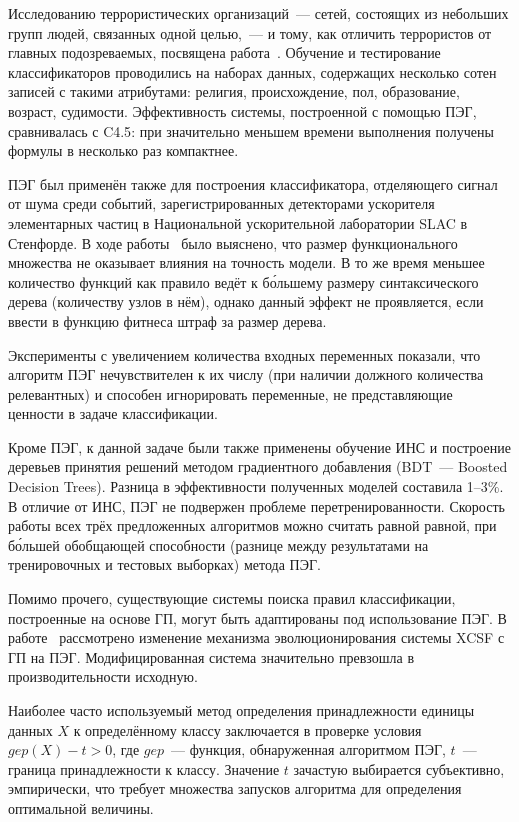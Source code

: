 Исследованию террористических организаций~--- сетей, состоящих из небольших групп людей, связанных одной целью,~--- и тому, как отличить террористов от главных подозреваемых, посвящена работа~\cite{conf/wisi/QiaoTPFX06}. Обучение и тестирование классификаторов проводились на наборах данных, содержащих несколько сотен записей с такими атрибутами: религия, происхождение, пол, образование, возраст, судимости. Эффективность системы, построенной с помощью ПЭГ, сравнивалась с {C4.5}: при значительно меньшем времени выполнения получены формулы в несколько раз компактнее.

ПЭГ был применён также для построения классификатора, отделяющего сигнал от шума среди событий, зарегистрированных детекторами ускорителя элементарных частиц в Национальной ускорительной лаборатории SLAC в Стенфорде. В ходе работы~\cite{Teodorescu:2006:IEEETNS} было выяснено, что размер функционального множества не оказывает влияния на точность модели. В то же время меньшее количество функций как правило ведёт к б\'{о}льшему размеру синтаксического дерева (количеству узлов в нём), однако данный эффект не проявляется, если ввести в функцию фитнеса штраф за размер дерева.

Эксперименты с увеличением количества входных переменных показали, что алгоритм ПЭГ нечувствителен к их числу (при наличии должного количества релевантных) и способен игнорировать переменные, не представляющие ценности в задаче классификации.

Кроме ПЭГ, к данной задаче были также применены обучение ИНС и построение деревьев принятия решений методом градиентного добавления (BDT~--- Boosted Decision Trees). Разница в эффективности полученных моделей составила 1--3\%. В отличие от ИНС, ПЭГ не подвержен проблеме перетренированности. Скорость работы всех трёх предложенных алгоритмов можно считать равной равной, при б\'{о}льшей обобщающей способности (разнице между результатами на тренировочных и тестовых выборках) метода ПЭГ.

Помимо прочего, существующие системы поиска правил классификации, построенные на основе ГП, могут быть адаптированы под использование ПЭГ. В работе~\cite{conf/iwcls/Wilson07} рассмотрено изменение механизма эволюционирования системы XCSF с ГП на ПЭГ. Модифицированная система значительно превзошла в производительности исходную.

Наиболее часто используемый метод определения принадлежности единицы данных $X$ к определённому классу заключается в проверке условия $gep(X) - t > 0$, где $gep$~--- функция, обнаруженная алгоритмом ПЭГ, $t$~--- граница принадлежности к классу. Значение $t$ зачастую выбирается субъективно, эмпирически, что требует множества запусков алгоритма для определения оптимальной величины.

